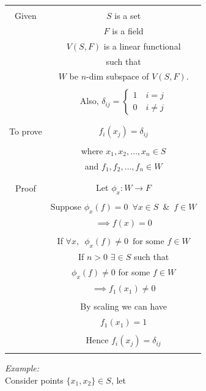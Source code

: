 \begin{table}[h!]
\begin{center}
\begin{tabular}{|c|c|}
\hline
& \\
Given & $S$ is a set\\
& $F$ is a field\\
& $V(S,F)$ is a linear functional\\
& such that\\
& $W$ be $n$-dim subspace of $V(S,F)$.\\
& \\
& Also, \quad $\delta_{ij} = \begin{cases}1 \quad i=j\\ 0 \quad i \neq j \end{cases}$\\
& \\
\hline
& \\
To prove & $f_i(x_j) = \delta_{ij}$\\
& \\
& where $x_1, x_2, \dots, x_n \in S$\\
& and $f_1,f_2,\dots,f_n \in W$\\
& \\
\hline
& \\
Proof & Let $\phi_x : W \rightarrow F$\\
& \\
& Suppose $\phi_x(f) = 0 \enspace \forall x \in S \enspace \& \enspace f \in W$\\
& $\implies f(x) = 0$\\
& \\
& If $ \forall x, \enspace \phi_x(f) \neq 0 \enspace \text{for some } f \in W$\\
& If $n>0$ $\exists \in S$ such that\\
& $\phi_x(f) \neq 0$ for some $f \in W$\\
& $\implies f_1(x_1)\neq0$\\
& \\
& By scaling we can have\\
& $f_1(x_1) = 1$\\
& \\
& Hence $f_i(x_j) = \delta_{ij}$\\
& \\
\hline
\end{tabular}
\end{center}
\end{table}
{\em Example: }
\\
Consider points $\{x_1, x_2\} \in S$, let
